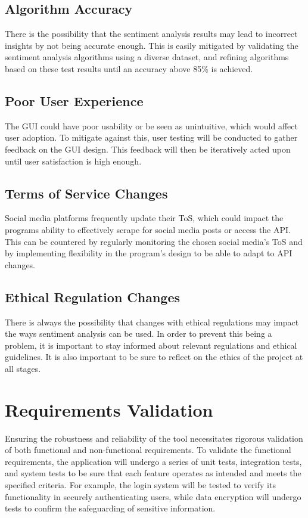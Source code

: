     \subsection{Algorithm Accuracy}
    There is the possibility that the sentiment analysis results may lead to incorrect insights by not being accurate enough. This is easily mitigated by validating the sentiment analysis algorithms using a diverse dataset, and refining algorithms based on these test results until an accuracy above 85\% is achieved. 

    \subsection{Poor User Experience}
    The GUI could have poor usability or be seen as unintuitive, which would affect user adoption. To mitigate against this, user testing will be conducted to gather feedback on the GUI design. This feedback will then be iteratively acted upon until user satisfaction is high enough.

    \subsection{Terms of Service Changes}
    Social media platforms frequently update their ToS, which could impact the programs ability to effectively scrape for social media posts or access the API. This can be countered by regularly monitoring the chosen social media's ToS and by implementing flexibility in the program's design to be able to adapt to API changes.

    \subsection{Ethical Regulation Changes}
    There is always the possibility that changes with ethical regulations may impact the ways sentiment analysis can be used. In order to prevent this being a problem, it is important to stay informed about relevant regulations and ethical guidelines. It is also important to be sure to reflect on the ethics of the project at all stages.


\section{Requirements Validation}
Ensuring the robustness and reliability of the tool necessitates rigorous validation of both functional and non-functional requirements. To validate the functional requirements, the application will undergo a series of unit tests, integration tests, and system tests to be sure that each feature operates as intended and meets the specified criteria. For example, the login system will be tested to verify its functionality in securely authenticating users, while data encryption will undergo tests to confirm the safeguarding of sensitive information.

